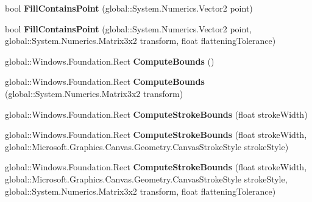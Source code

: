 \begin{DoxyCompactItemize}
bool {\bfseries Fill\+Contains\+Point} (global\+::\+System.\+Numerics.\+Vector2 point)
\item 
\mbox{\label{class_microsoft_1_1_graphics_1_1_canvas_1_1_geometry_1_1_canvas_geometry_a5952326043566da1708fc1be2b2677c0}} 
bool {\bfseries Fill\+Contains\+Point} (global\+::\+System.\+Numerics.\+Vector2 point, global\+::\+System.\+Numerics.\+Matrix3x2 transform, float flattening\+Tolerance)
\item 
\mbox{\label{class_microsoft_1_1_graphics_1_1_canvas_1_1_geometry_1_1_canvas_geometry_abdbf95c37d4fceb533f79fc841fb2226}} 
global\+::\+Windows.\+Foundation.\+Rect {\bfseries Compute\+Bounds} ()
\item 
\mbox{\label{class_microsoft_1_1_graphics_1_1_canvas_1_1_geometry_1_1_canvas_geometry_a5764fbff119976df677cb8f61c790158}} 
global\+::\+Windows.\+Foundation.\+Rect {\bfseries Compute\+Bounds} (global\+::\+System.\+Numerics.\+Matrix3x2 transform)
\item 
\mbox{\label{class_microsoft_1_1_graphics_1_1_canvas_1_1_geometry_1_1_canvas_geometry_ae0b4d41a78ebb80d02c862619a7d69cd}} 
global\+::\+Windows.\+Foundation.\+Rect {\bfseries Compute\+Stroke\+Bounds} (float stroke\+Width)
\item 
\mbox{\label{class_microsoft_1_1_graphics_1_1_canvas_1_1_geometry_1_1_canvas_geometry_a1944cea013afac73147a5ab67b3adf46}} 
global\+::\+Windows.\+Foundation.\+Rect {\bfseries Compute\+Stroke\+Bounds} (float stroke\+Width, global\+::\+Microsoft.\+Graphics.\+Canvas.\+Geometry.\+Canvas\+Stroke\+Style stroke\+Style)
\item 
\mbox{\label{class_microsoft_1_1_graphics_1_1_canvas_1_1_geometry_1_1_canvas_geometry_a2587e2485f5e40dce3e189b1e840c170}} 
global\+::\+Windows.\+Foundation.\+Rect {\bfseries Compute\+Stroke\+Bounds} (float stroke\+Width, global\+::\+Microsoft.\+Graphics.\+Canvas.\+Geometry.\+Canvas\+Stroke\+Style stroke\+Style, global\+::\+System.\+Numerics.\+Matrix3x2 transform, float flattening\+Tolerance)

\end{DoxyCompactItemize}
